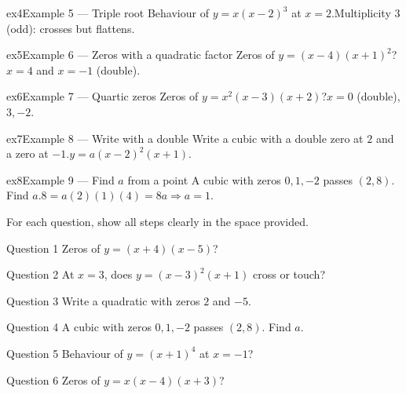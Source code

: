 \documentclass[11pt]{article}
\begin{document}
\begin{example}{ex4}{Example 5 --- Triple root}
Behaviour of $y=x(x-2)^3$ at $x=2$.\soln Multiplicity 3 (odd): crosses but flattens.
\end{example}

\begin{example}{ex5}{Example 6 --- Zeros with a quadratic factor}
Zeros of $y=(x-4)(x+1)^2$?\soln $x=4$ and $x=-1$ (double).
\end{example}

\begin{example}{ex6}{Example 7 --- Quartic zeros}
Zeros of $y=x^2(x-3)(x+2)$?\soln $x=0$ (double), $3,-2$.
\end{example}

\begin{example}{ex7}{Example 8 --- Write with a double}
Write a cubic with a double zero at $2$ and a zero at $-1$.\soln $y=a(x-2)^2(x+1)$.
\end{example}

\begin{example}{ex8}{Example 9 --- Find $a$ from a point}
A cubic with zeros $0,1,-2$ passes $(2,8)$. Find $a$.\soln $8=a(2)(1)(4)=8a\Rightarrow a=1$.
\end{example}

\clearpage
{}
For each question, show all steps clearly in the space provided.

\begin{qbox}{Question 1}
Zeros of $y=(x+4)(x-5)$?\workspace{2.4cm}
\end{qbox}

\begin{qbox}{Question 2}
At $x=3$, does $y=(x-3)^2(x+1)$ cross or touch?\workspace{2.4cm}
\end{qbox}

\begin{qbox}{Question 3}
Write a quadratic with zeros $2$ and $-5$.\workspace{2.4cm}
\end{qbox}

\begin{qbox}{Question 4}
A cubic with zeros $0,1,-2$ passes $(2,8)$. Find $a$.\workspace{2.4cm}
\end{qbox}

\begin{qbox}{Question 5}
Behaviour of $y=(x+1)^4$ at $x=-1$?\workspace{2.4cm}
\end{qbox}

\begin{qbox}{Question 6}
Zeros of $y=x(x-4)(x+3)$?\workspace{2.4cm}
\end{qbox}
\end{document}
